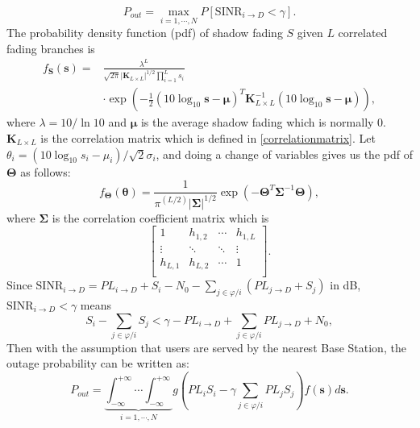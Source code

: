 \documentclass[journal,comsoc]{IEEEtran}
\begin{document}
\begin{equation}
P_{out} = \max_{i = 1,\cdots,N} P[\text{SINR}_{i\to D}<\gamma].
\end{equation}
The probability density function (pdf) of shadow fading $S$ given $L$ correlated fading branches is
\begin{equation}
\begin{split}
f_{\mathbf{S}}(\mathbf{s}) = &\frac{\lambda^{L}}{\sqrt{2\pi}|\mathbf{K}_{L\times L}|^{1/2}\prod_{i=1}^{L}s_{i}}\\
&\cdot\exp(-\frac{1}{2}(10\log_{10}\mathbf{s}-\mathbf{\mu})^{T}\mathbf{K}_{L\times L}^{-1}(10\log_{10}\mathbf{s}-\mathbf{\mu})),
\end{split}
\end{equation}
where $\lambda = 10/\ln10$ and $\mathbf{\mu}$ is the average shadow fading which is normally $0$. $\mathbf{K}_{L\times L}$ is the correlation matrix which is defined in \eqref{correlationmatrix}. Let $\theta_{i} = (10\log_{10}s_{i}-\mu_{i})/\sqrt{2}\sigma_{i}$, and doing a change of variables gives us the pdf of $\mathbf{\Theta}$ as follows:
\begin{equation}
f_{\mathbf{\Theta}}(\mathbf{\theta}) = \frac{1}{\pi^(L/2)|\mathbf{\Sigma}|^{1/2}}\exp(-\mathbf{\Theta}^{T}\mathbf{\Sigma}^{-1}\mathbf{\Theta}),
\end{equation}
where $\mathbf{\Sigma}$ is the correlation coefficient matrix which is
\begin{equation}
\left[\begin{array}{cccc}
1 & h_{1,2} & \cdots & h_{1,L}\\
\vdots & \ddots & \ddots & \vdots\\
h_{L,1} & h_{L,2} & \cdots & 1\\
\end{array}\right].
\end{equation}
Since $\text{SINR}_{i\to D}=PL_{i\to D}+S_{i}-N_{0}-\sum_{j\in\varphi/i}(PL_{j\to D} + S_{j})$ in dB, $\text{SINR}_{i\to D}<\gamma$ means
\begin{equation}
S_{i} - \sum_{j\in\varphi/i}S_{j}<\gamma -PL_{i\to D} + \sum_{j\in\varphi/i}PL_{j\to D} + N_{0},
\end{equation}
Then with the assumption that users are served by the nearest Base Station, the outage probability can be written as:
\begin{equation}
\label{outprob}
P_{out} = \underbrace{\int_{-\infty}^{+\infty}\cdots\int_{-\infty}^{+\infty}}_{i =1,\cdots,N} g(PL_{i}S_{i} - \gamma\sum_{j\in\varphi/i}PL_{j}S_{j})f(\mathbf{s})d\mathbf{s}.
\end{equation}
\end{document}

